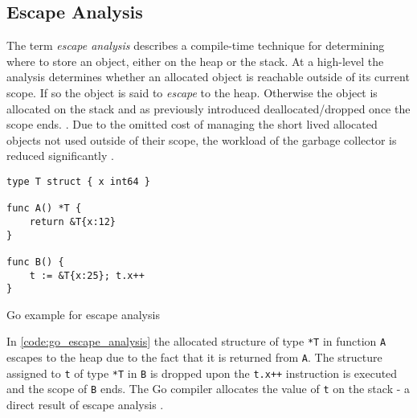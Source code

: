 \subsection{Escape Analysis}

The term \textit{escape analysis} describes a compile-time technique for
determining where to store an object, either on the heap or the stack. At a
high-level the analysis determines whether an allocated object is reachable
outside of its current scope. If so the object is said to \textit{escape} to
the heap. Otherwise the object is allocated on the stack and as previously
introduced deallocated/dropped once the scope ends.
\cite[\texttt{l.18}]{go-escape}. Due to the omitted cost of managing the short
lived allocated objects not used outside of their scope, the workload of the
garbage collector is reduced significantly \cite[Escape
analysis]{go_gcguide_2022}.


\begin{listing}[H] 
    \begin{verbatim} 
type T struct { x int64 }

func A() *T {
    return &T{x:12}
}

func B() {
    t := &T{x:25}; t.x++
}
    \end{verbatim}
    \caption{Go example for escape analysis}
    \label{code:go_escape_analysis}
\end{listing}

In \autoref{code:go_escape_analysis} the allocated structure of type
\texttt{*T} in function \texttt{A} escapes to the heap due to the fact that it
is returned from \texttt{A}. The structure assigned to \texttt{t} of type
\texttt{*T} in \texttt{B} is dropped upon the \texttt{t.x++}
instruction is executed and the scope of \texttt{B} ends. The Go compiler
allocates the value of \texttt{t} on the stack - a direct result of escape
analysis \cite{go-escape}.
